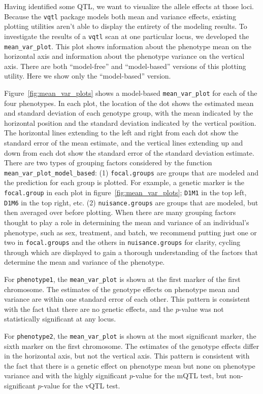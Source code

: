 \documentclass{article}
\begin{document}
Having identified some QTL, we want to visualize the allele effects at those loci.
Because the \texttt{vqtl} package models both mean and variance effects, existing plotting utilities aren't able to display the entirety of the modeling results.
To investigate the results of a \texttt{vqtl} scan at one particular locus, we developed the \texttt{mean\_var\_plot}.
This plot shows information about the phenotype mean on the horizontal axis and information about the phenotype variance on the vertical axis.
There are both ``model-free'' and ``model-based'' versions of this plotting utility.
Here we show only the ``model-based'' version.

Figure~\ref{fig:mean_var_plots} shows a model-based \texttt{mean\_var\_plot} for each of the four phenotypes.
In each plot, the location of the dot shows the estimated mean and standard deviation of each genotype group, with the mean indicated by the horizontal position and the standard deviation indicated by the vertical position.
The horizontal lines extending to the left and right from each dot show the standard error of the mean estimate, and the vertical lines extending up and down from each dot show the standard error of the standard deviation estimate.
There are two types of grouping factors considered by the function \texttt{mean\_var\_plot\_model\_based}:
(1) \texttt{focal.groups} are groups that are modeled and the prediction for each group is plotted.
For example, a genetic marker is the \texttt{focal.group} in each plot in figure~\ref{fig:mean_var_plots}; \texttt{D1M1} in the top left, \texttt{D1M6} in the top right, etc.
(2) \texttt{nuisance.groups} are groups that are modeled, but then averaged over before plotting.
When there are many grouping factors thought to play a role in determining the mean and variance of an individual's phenotype, such as sex, treatment, and batch, we recommend putting just one or two in \texttt{focal.groups} and the others in \texttt{nuisance.groups} for clarity, cycling through which are displayed to gain a thorough understanding of the factors that determine the mean and variance of the phenotype.

For \texttt{phenotype1}, the \texttt{mean\_var\_plot} is shown at the first marker of the first chromosome.
The estimates of the genotype effects on phenotype mean and variance are within one standard error of each other.
This pattern is consistent with the fact that there are no genetic effects, and the $p$-value was not statistically significant at any locus.

For \texttt{phenotype2}, the \texttt{mean\_var\_plot} is shown at the most significant marker, the sixth marker on the first chromosome.
The estimates of the genotype effects differ in the horizontal axis, but not the vertical axis.
This pattern is consistent with the fact that there is a genetic effect on phenotype mean but none on phenotype variance and with the highly significant $p$-value for the mQTL test, but non-significant $p$-value for the vQTL test.
\end{document}
